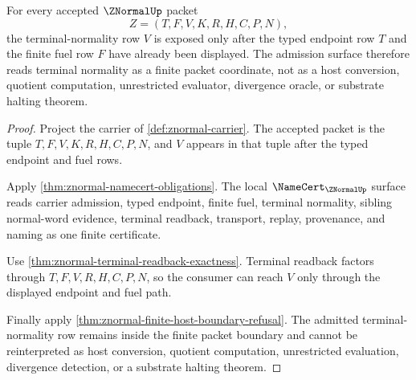 \begin{theorem}
\label{thm:znormal-terminal-normality-admission}
For every accepted $\ZNormalUp$ packet
$$
Z=(T,F,V,K,R,H,C,P,N),
$$
the terminal-normality row $V$ is exposed only after the typed endpoint row
$T$ and the finite fuel row $F$ have already been displayed. The admission
surface therefore reads terminal normality as a finite packet coordinate, not
as a host conversion, quotient computation, unrestricted evaluator, divergence
oracle, or substrate halting theorem.
\end{theorem}
\begin{proof}
Project the carrier of \autoref{def:znormal-carrier}. The accepted packet is
the tuple $T,F,V,K,R,H,C,P,N$, and $V$ appears in that tuple after the typed
endpoint and fuel rows.

Apply \autoref{thm:znormal-namecert-obligations}. The local
$\NameCert_{\ZNormalUp}$ surface reads carrier admission, typed endpoint,
finite fuel, terminal normality, sibling normal-word evidence, terminal
readback, transport, replay, provenance, and naming as one finite certificate.

Use \autoref{thm:znormal-terminal-readback-exactness}. Terminal readback
factors through $T,F,V,R,H,C,P,N$, so the consumer can reach $V$ only through
the displayed endpoint and fuel path.

Finally apply \autoref{thm:znormal-finite-host-boundary-refusal}. The admitted
terminal-normality row remains inside the finite packet boundary and cannot be
reinterpreted as host conversion, quotient computation, unrestricted
evaluation, divergence detection, or a substrate halting theorem.
\end{proof}


